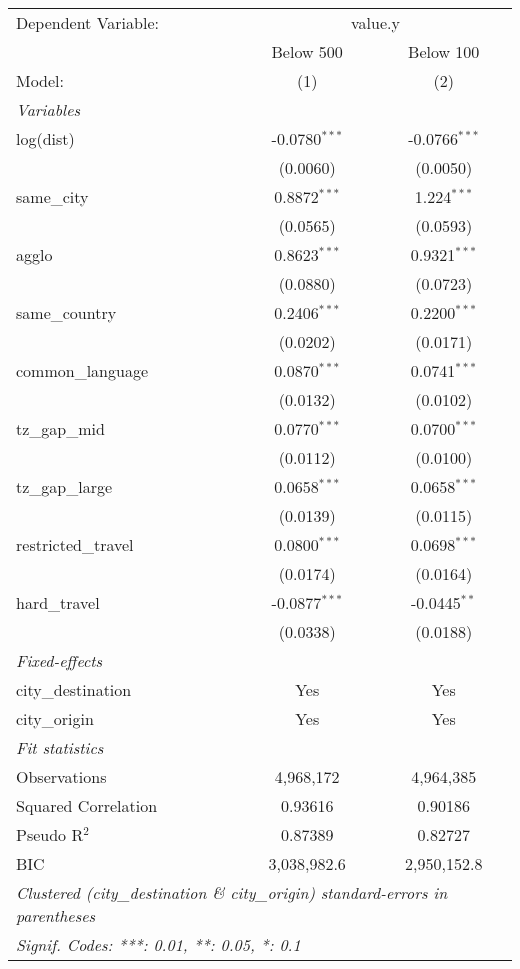 
\begingroup
\centering
\begin{tabular}{lcc}
   \tabularnewline \midrule \midrule
   Dependent Variable: & \multicolumn{2}{c}{value.y}\\
                       & Below 500       & Below 100 \\   
   Model:              & (1)             & (2)\\  
   \midrule
   \emph{Variables}\\
   log(dist)           & -0.0780$^{***}$ & -0.0766$^{***}$\\   
                       & (0.0060)        & (0.0050)\\   
   same\_city          & 0.8872$^{***}$  & 1.224$^{***}$\\   
                       & (0.0565)        & (0.0593)\\   
   agglo               & 0.8623$^{***}$  & 0.9321$^{***}$\\   
                       & (0.0880)        & (0.0723)\\   
   same\_country       & 0.2406$^{***}$  & 0.2200$^{***}$\\   
                       & (0.0202)        & (0.0171)\\   
   common\_language    & 0.0870$^{***}$  & 0.0741$^{***}$\\   
                       & (0.0132)        & (0.0102)\\   
   tz\_gap\_mid        & 0.0770$^{***}$  & 0.0700$^{***}$\\   
                       & (0.0112)        & (0.0100)\\   
   tz\_gap\_large      & 0.0658$^{***}$  & 0.0658$^{***}$\\   
                       & (0.0139)        & (0.0115)\\   
   restricted\_travel  & 0.0800$^{***}$  & 0.0698$^{***}$\\   
                       & (0.0174)        & (0.0164)\\   
   hard\_travel        & -0.0877$^{***}$ & -0.0445$^{**}$\\   
                       & (0.0338)        & (0.0188)\\   
   \midrule
   \emph{Fixed-effects}\\
   city\_destination   & Yes             & Yes\\  
   city\_origin        & Yes             & Yes\\  
   \midrule
   \emph{Fit statistics}\\
   Observations        & 4,968,172       & 4,964,385\\  
   Squared Correlation & 0.93616         & 0.90186\\  
   Pseudo R$^2$        & 0.87389         & 0.82727\\  
   BIC                 & 3,038,982.6     & 2,950,152.8\\  
   \midrule \midrule
   \multicolumn{3}{l}{\emph{Clustered (city\_destination \& city\_origin) standard-errors in parentheses}}\\
   \multicolumn{3}{l}{\emph{Signif. Codes: ***: 0.01, **: 0.05, *: 0.1}}\\
\end{tabular}
\par\endgroup


